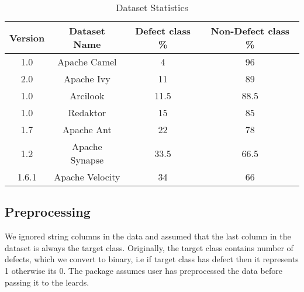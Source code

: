 \documentclass[sigconf]{acmart}
\theoremstyle{break}
\begin{document}
 \begin{table}[!htbp]
\begin{center}
\begin{tabular}{|c|c|c|c|}
\hline 
\textbf{Version} & \textbf{Dataset Name} &  \textbf{Defect class \%} & \textbf{Non-Defect class \%}\\[0.5ex]
\hline
1.0 & Apache Camel & 4 & 96 \\ 
\hline
2.0 & Apache Ivy & 11 & 89 \\ 
\hline
1.0 & Arcilook & 11.5 & 88.5\\
\hline
1.0 & Redaktor & 15 & 85 \\
\hline
1.7 & Apache Ant & 22 & 78 \\ 
\hline
1.2 & Apache Synapse & 33.5 & 66.5 \\
\hline
1.6.1 & Apache Velocity & 34 & 66 \\
\hline
\end{tabular}
\end{center}
\caption{Dataset Statistics}
\label{tb:dataset}
\end{table}

\subsection{\textbf{Preprocessing}}
 We ignored  string columns in the data and assumed that the last column in the dataset is always the target class. Originally, the target class contains number of defects, which we convert to binary, i.e if target class has defect then it represents 1 otherwise its 0. The package assumes user has preprocessed the data before passing it to the leards. 
\end{document}
